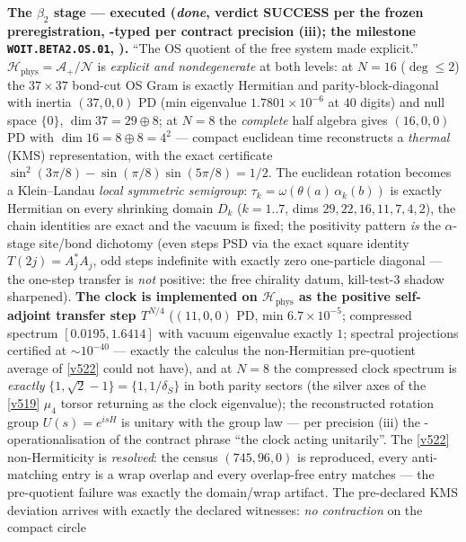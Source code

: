 \par\smallskip\noindent\textbf{The $\beta_2$ stage --- executed (\emph{done}, verdict SUCCESS
per the frozen preregistration, \mC-typed per contract precision (iii); the milestone
\texttt{WOIT.BETA2.OS.01}, ).} ``The OS quotient of
the free system made explicit.'' $\mathcal H_{\mathrm{phys}} = \mathcal A_+/\mathcal N$ is
\emph{explicit and nondegenerate} at both levels: at $N = 16$ ($\deg\le2$) the $37{\times}37$
bond-cut OS Gram is exactly Hermitian and parity-block-diagonal with inertia $(37, 0, 0)$ PD
(min eigenvalue $1.7801\times10^{-6}$ at $40$ digits) and null space $\{0\}$,
$\dim 37 = 29 \oplus 8$; at $N = 8$ the \emph{complete} half algebra gives $(16, 0, 0)$ PD
with $\dim 16 = 8 \oplus 8 = 4^2$ --- compact euclidean time reconstructs a \emph{thermal}
(KMS) representation, with the exact certificate
$\sin^2(3\pi/8) - \sin(\pi/8)\sin(5\pi/8) = 1/2$. The euclidean rotation becomes a
Klein--Landau \emph{local symmetric semigroup}: $\tau_k = \omega(\theta(a)\,\alpha_k(b))$ is
exactly Hermitian on every shrinking domain $D_k$ ($k = 1..7$, dims $29, 22, 16, 11, 7, 4,
2$), the chain identities are exact and the vacuum is fixed; the positivity pattern \emph{is}
the $\alpha$-stage site/bond dichotomy (even steps PSD via the exact square identity
$T(2j) = A_j^*A_j$, odd steps indefinite with exactly zero one-particle diagonal --- the
one-step transfer is \emph{not} positive: the free chirality datum, kill-test-3 shadow
sharpened). \textbf{The clock is implemented on $\mathcal H_{\mathrm{phys}}$ as the positive
self-adjoint transfer step $T^{N/4}$} ($(11,0,0)$ PD, min $6.7\times10^{-5}$; compressed
spectrum $[0.0195, 1.6414]$ with vacuum eigenvalue exactly $1$; spectral projections
certified at $\sim10^{-40}$ --- exactly the calculus the non-Hermitian pre-quotient average
of \vref{v522} could not have), and at $N = 8$ the compressed clock spectrum is
\emph{exactly} $\{1, \sqrt2 - 1\} = \{1, 1/\delta_S\}$ in both parity sectors (the silver
axes of the \vref{v519} $\mu_4$ torsor returning as the clock eigenvalue); the reconstructed
rotation group $U(s) = e^{isH}$ is unitary with the group law --- per precision (iii) the
\mC-operationalisation of the contract phrase ``the clock acting unitarily''. The
\vref{v522} non-Hermiticity is \emph{resolved}: the census $(745, 96, 0)$ is reproduced,
every anti-matching entry is a wrap overlap and every overlap-free entry matches --- the
pre-quotient failure was exactly the domain/wrap artifact. The pre-declared KMS deviation
arrives with exactly the declared witnesses: \emph{no contraction} on the compact circle
